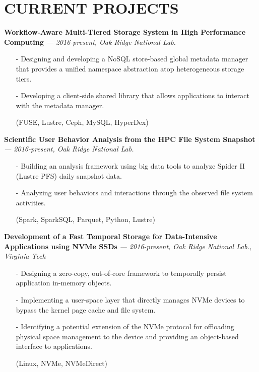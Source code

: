 \section{CURRENT PROJECTS}
\vspace{.03in}
  {\bf Workflow-Aware Multi-Tiered Storage System in High Performance Computing}
   {\it \footnotesize --- 2016-present, Oak Ridge National Lab.}
   \begin{itemize}[leftmargin=*]
    \setlength\itemsep{-0.02in}
    \item[-] Designing and developing a NoSQL store-based global metadata manager
	     that provides a unified namespace abstraction atop heterogeneous
	     storage tiers.
    \item[-] Developing a client-side shared library that allows applications to interact
             with the metadata manager.
    \item[] {\small(FUSE, Lustre, Ceph, MySQL, HyperDex)}
   \end{itemize}
  \vspace{-0.15in}
  {\bf Scientific User Behavior Analysis from the HPC File System Snapshot}
   {\it \footnotesize --- 2016-present, Oak Ridge National Lab.}
   \begin{itemize}[leftmargin=*]
    \setlength\itemsep{-0.02in}
    \item[-] Building an analysis framework using big data tools to analyze Spider II (Lustre PFS) daily snapshot data.
    \item[-] Analyzing user behaviors and interactions through the observed file system activities.
    \item[] {\small(Spark, SparkSQL, Parquet, Python, Lustre)}
   \end{itemize}
  \vspace{-0.15in}
  {\bf Development of a Fast Temporal Storage for Data-Intensive Applications using NVMe SSDs}
   {\it \footnotesize --- 2016-present, Oak Ridge National Lab., Virginia Tech}
   \begin{itemize}[leftmargin=*]
    \setlength\itemsep{-0.02in}
    \item[-] Designing a zero-copy, out-of-core framework to temporally persist 
             application in-memory objects.
    \item[-] Implementing a user-space layer that directly manages NVMe
             devices to bypass the kernel page cache and file system.
    \item[-] Identifying a potential extension of the NVMe protocol 
             for offloading physical space management to the device and
             providing an object-based interface to applications.
    \item[] {\small(Linux, NVMe, NVMeDirect)}
   \end{itemize}
 

